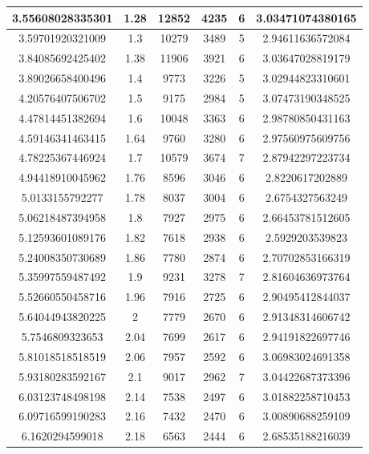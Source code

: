 \documentclass[a4paper]{report}
\numberwithin{equation}{section}
\begin{document}
\begin{table}[!ht]
\begin{tabular}{|c|c|c|c|c|c|}
        3.55608028335301 & 1.28 & 12852 & 4235 & 6 & 3.03471074380165 \\ \hline
        3.59701920321009 & 1.3 & 10279 & 3489 & 5 & 2.94611636572084 \\ \hline
        3.84085692425402 & 1.38 & 11906 & 3921 & 6 & 3.03647028819179 \\ \hline
        3.89026658400496 & 1.4 & 9773 & 3226 & 5 & 3.02944823310601 \\ \hline
        4.20576407506702 & 1.5 & 9175 & 2984 & 5 & 3.07473190348525 \\ \hline
        4.47814451382694 & 1.6 & 10048 & 3363 & 6 & 2.98780850431163 \\ \hline
        4.59146341463415 & 1.64 & 9760 & 3280 & 6 & 2.97560975609756 \\ \hline
        4.78225367446924 & 1.7 & 10579 & 3674 & 7 & 2.87942297223734 \\ \hline
        4.94418910045962 & 1.76 & 8596 & 3046 & 6 & 2.8220617202889 \\ \hline
        5.0133155792277 & 1.78 & 8037 & 3004 & 6 & 2.6754327563249 \\ \hline
        5.06218487394958 & 1.8 & 7927 & 2975 & 6 & 2.66453781512605 \\ \hline
        5.12593601089176 & 1.82 & 7618 & 2938 & 6 & 2.5929203539823 \\ \hline
        5.24008350730689 & 1.86 & 7780 & 2874 & 6 & 2.70702853166319 \\ \hline
        5.35997559487492 & 1.9 & 9231 & 3278 & 7 & 2.81604636973764 \\ \hline
        5.52660550458716 & 1.96 & 7916 & 2725 & 6 & 2.90495412844037 \\ \hline
        5.64044943820225 & 2 & 7779 & 2670 & 6 & 2.91348314606742 \\ \hline
        5.7546809323653 & 2.04 & 7699 & 2617 & 6 & 2.94191822697746 \\ \hline
        5.81018518518519 & 2.06 & 7957 & 2592 & 6 & 3.06983024691358 \\ \hline
        5.93180283592167 & 2.1 & 9017 & 2962 & 7 & 3.04422687373396 \\ \hline
        6.03123748498198 & 2.14 & 7538 & 2497 & 6 & 3.01882258710453 \\ \hline
        6.09716599190283 & 2.16 & 7432 & 2470 & 6 & 3.00890688259109 \\ \hline
        6.1620294599018 & 2.18 & 6563 & 2444 & 6 & 2.68535188216039 \\ \hline

\end{tabular}
\end{table}
\end{document}
